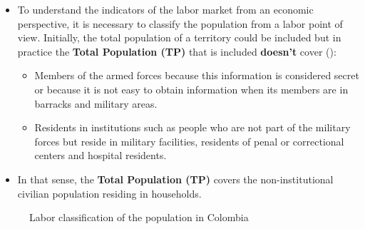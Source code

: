 \documentclass[
  ignorenonframetext,
]{beamer}
\begin{document}
\begin{frame}{}
\label{section-2}
\begin{itemize}
\item
  To understand the indicators of the labor market from an economic
  perspective, it is necessary to classify the population from a labor
  point of view. Initially, the total population of a territory could be
  included but in practice the \textbf{Total Population (TP)} that is
  included \textbf{doesn't} cover
  ():

  \begin{itemize}
  \item
    Members of the armed forces because this information is considered
    secret or because it is not easy to obtain information when its
    members are in barracks and military areas.
  \item
    Residents in institutions such as people who are not part of the
    military forces but reside in military facilities, residents of
    penal or correctional centers and hospital residents.
  \end{itemize}
\item
  In that sense, the \textbf{Total Population (TP)} covers the
  non-institutional civilian population residing in households.
\end{itemize}
\end{frame}

\begin{frame}{}
\label{section-3}
\begin{figure}


\caption{\label{fig-labor-classification-col}Labor classification of the
population in Colombia}

\end{figure}%
\end{frame}
\end{document}
